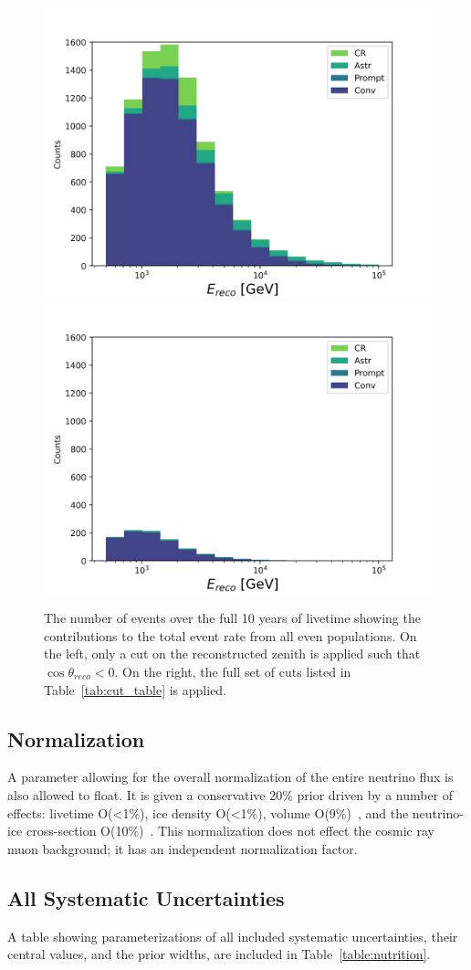 \documentclass[main.tex]{subfiles}
\begin{document}
\begin{figure}
    \centering
    \includegraphics[width=0.45\linewidth]{figures/zenith_only_cut.png}%
    \includegraphics[width=0.45\linewidth]{figures/all_cuts.png}
    \caption{The number of events over the full 10 years of livetime showing the contributions to the total event rate from all even populations. On the left, only a cut on the reconstructed zenith is applied such that $\cos\theta_{reco}<0$. On the right, the full set of cuts listed in Table~\ref{tab:cut_table} is applied. }\label{fig:cut_figure}
\end{figure}

\subsection{Normalization}

A parameter allowing for the overall normalization of the entire neutrino flux is also allowed to float. 
It is given a conservative 20\% prior driven by a number of effects: livetime O(<1\%), ice density O(<1\%), volume O(9\%)~\cite{Sandrock_2020}, and the neutrino-ice cross-section O(10\%)~\cite{candido2023neutrino}. 
This normalization does not effect the cosmic ray muon background; it has an independent normalization factor. 

\subsection{All Systematic Uncertainties}

A table showing parameterizations of all included systematic uncertainties, their central values, and the prior widths, are included in Table~\ref{table:nutrition}.
\end{document}
